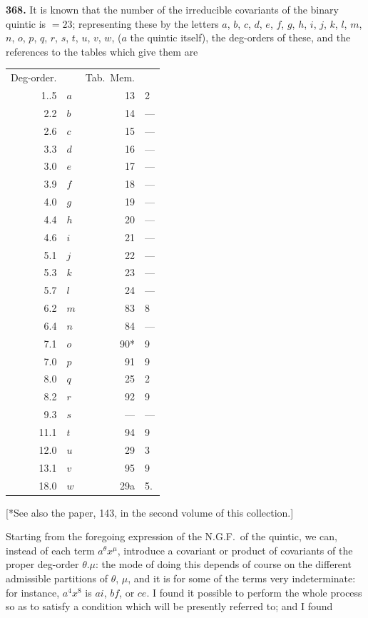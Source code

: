 \documentclass[11pt,a4paper]{book}
\begin{document}
\noindent\textbf{368.} It is known that the number of the irreducible covariants of the binary quintic is $=23$; representing these by the letters $a$, $b$, $c$, $d$, $e$, $f$, $g$, $h$, $i$, $j$, $k$, $l$, $m$, $n$, $o$, $p$, $q$, $r$, $s$, $t$, $u$, $v$, $w$, ($a$ the quintic itself), the deg-orders of these, and the references to the tables which give them are
\begin{center}
\begin{tabular}{r@{\quad}l@{\quad}r@{\quad}l}
Deg-order. & & Tab.\ Mem. & \\[2pt]
1..5 & $a$ & 13 & 2 \\
2.2 & $b$ & 14 & --- \\
2.6 & $c$ & 15 & --- \\
3.3 & $d$ & 16 & --- \\
3.0 & $e$ & 17 & --- \\
3.9 & $f$ & 18 & --- \\
4.0 & $g$ & 19 & --- \\
4.4 & $h$ & 20 & --- \\
4.6 & $i$ & 21 & --- \\
5.1 & $j$ & 22 & --- \\
5.3 & $k$ & 23 & --- \\
5.7 & $l$ & 24 & --- \\
6.2 & $m$ & 83 & 8 \\
6.4 & $n$ & 84 & --- \\
7.1 & $o$ & 90* & 9 \\
7.0 & $p$ & 91 & 9 \\
8.0 & $q$ & 25 & 2 \\
8.2 & $r$ & 92 & 9 \\
9.3 & $s$ & --- & --- \\
11.1 & $t$ & 94 & 9 \\
12.0 & $u$ & 29 & 3 \\
13.1 & $v$ & 95 & 9 \\
18.0 & $w$ & 29a & 5.
\end{tabular}
\end{center}
[*See also the paper, 143, in the second volume of this collection.]

Starting from the foregoing expression of the N.G.F.\ of the quintic, we can, instead of each term $a^\theta x^\mu$, introduce a covariant or product of covariants of the proper deg-order $\theta.\mu$: the mode of doing this depends of course on the different admissible partitions of $\theta$, $\mu$, and it is for some of the terms very indeterminate: for instance, $a^4 x^8$ is $ai$, $bf$, or $ce$. I found it possible to perform the whole process so as to satisfy a condition which will be presently referred to; and I found
\end{document}
